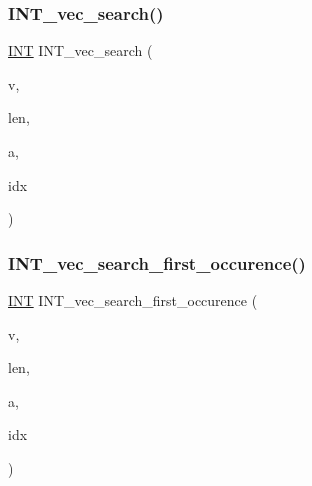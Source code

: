 \subsubsection{\texorpdfstring{I\+N\+T\+\_\+vec\+\_\+search()}{INT\_vec\_search()}}
{\footnotesize\ttfamily \mbox{\hyperlink{galois_8h_a09fddde158a3a20bd2dcadb609de11dc}{I\+NT}} I\+N\+T\+\_\+vec\+\_\+search (\begin{DoxyParamCaption}\item[{\mbox{\hyperlink{galois_8h_a09fddde158a3a20bd2dcadb609de11dc}{I\+NT}} $\ast$}]{v,  }\item[{\mbox{\hyperlink{galois_8h_a09fddde158a3a20bd2dcadb609de11dc}{I\+NT}}}]{len,  }\item[{\mbox{\hyperlink{galois_8h_a09fddde158a3a20bd2dcadb609de11dc}{I\+NT}}}]{a,  }\item[{\mbox{\hyperlink{galois_8h_a09fddde158a3a20bd2dcadb609de11dc}{I\+NT}} \&}]{idx }\end{DoxyParamCaption})}

\mbox{\label{sorting_8_c_a544ec7b1804104bea554694504404dfb}} 
\subsubsection{\texorpdfstring{I\+N\+T\+\_\+vec\+\_\+search\+\_\+first\+\_\+occurence()}{INT\_vec\_search\_first\_occurence()}}
{\footnotesize\ttfamily \mbox{\hyperlink{galois_8h_a09fddde158a3a20bd2dcadb609de11dc}{I\+NT}} I\+N\+T\+\_\+vec\+\_\+search\+\_\+first\+\_\+occurence (\begin{DoxyParamCaption}\item[{\mbox{\hyperlink{galois_8h_a09fddde158a3a20bd2dcadb609de11dc}{I\+NT}} $\ast$}]{v,  }\item[{\mbox{\hyperlink{galois_8h_a09fddde158a3a20bd2dcadb609de11dc}{I\+NT}}}]{len,  }\item[{\mbox{\hyperlink{galois_8h_a09fddde158a3a20bd2dcadb609de11dc}{I\+NT}}}]{a,  }\item[{\mbox{\hyperlink{galois_8h_a09fddde158a3a20bd2dcadb609de11dc}{I\+NT}} \&}]{idx }\end{DoxyParamCaption})}

\mbox{\label{sorting_8_c_ad0aa35e081da3ba3cc8841bf086ba9aa}} 
